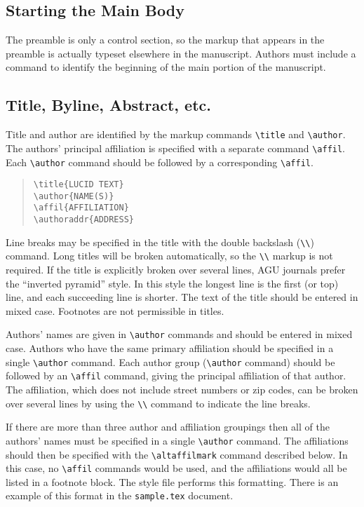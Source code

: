 \subsection{Starting the Main Body}

The preamble is only a control section, so the markup that appears 
in the preamble is actually typeset elsewhere in the manuscript.  
Authors must include a \verb"" command to identify 
the beginning of the main portion of the manuscript.

\subsection{Title, Byline, Abstract, etc.}

Title and author are identified by the markup commands \verb"\title" 
and \verb"\author".  The authors' principal affiliation is specified 
with a separate command \verb"\affil".  Each \verb"\author" command 
should be followed by a corresponding \verb"\affil". 
\begin{quote}
\verb"\title{LUCID TEXT}"\\
\verb"\author{NAME(S)}"\\
\verb"\affil{AFFILIATION}"\\
\verb"\authoraddr{ADDRESS}"
\end{quote}

Line breaks may be specified in the title with the double backslash 
(\verb"\\") command.  Long titles will be broken automatically, so 
the \verb"\\" markup is not required.  If the title is explicitly 
broken over several lines, AGU journals prefer the ``inverted pyramid'' 
style.  In this style the longest line is the first (or top) line, and 
each succeeding line is shorter.  The text of the title should be entered 
in mixed case.  Footnotes are not permissible in titles.

Authors' names are given in \verb"\author" commands and should be 
entered in mixed case.  Authors who have the same primary affiliation 
should be specified in a single \verb"\author" command.  Each author 
group (\verb"\author" command) should be followed by an \verb"\affil" 
command, giving the principal affiliation of that author.  The 
affiliation, which does not include street numbers or zip codes, 
can be broken over several lines by using the \verb"\\" command 
to indicate the line breaks. 

If there are more than three author and affiliation groupings then all 
of the authors' names must be specified in a single \verb"\author" command.  
The affiliations should then be specified with the \verb"\altaffilmark" 
command described below.  In this case, no \verb"\affil" commands would be 
used, and the affiliations would all be listed in a footnote block.  The 
style file performs this formatting.  There is an example of this format 
in the \verb"sample.tex" document.

